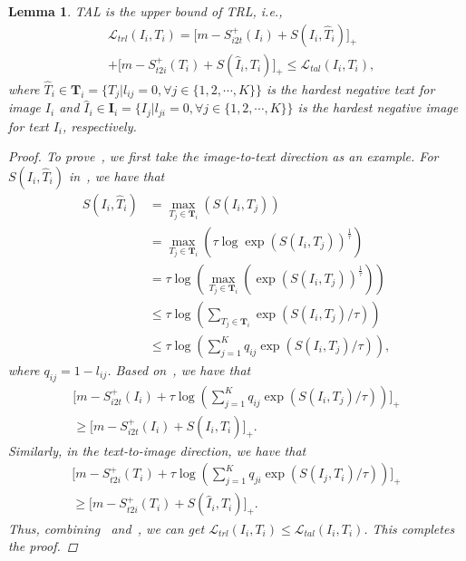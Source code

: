 \documentclass[10pt,twocolumn,letterpaper]{article}
\newtheorem{lemma}{Lemma}
\newtheorem{proof}{Proof}
\begin{document}
\begin{lemma}
    TAL is the upper bound of TRL, i.e.,
    \begin{equation}
    \begin{aligned}
        &\mathcal{L}_{trl}(I_i,T_i)= \big[ m -  S^+_{i2t}(I_i) +  S(I_i,\hat{T}_i)  \big]_+    \\
&+\big[ m -  S^+_{t2i}(T_i)  + S(\hat{I}_i,T_i) \big]_+ \leq \mathcal{L}_{tal}(I_i,T_i),
    \end{aligned}
    \label{eq2}
    \end{equation}
    where $\hat{T}_i\in\mathbf{T}_i=\{ T_j|l_{ij}=0, \forall j\in \{1,2,\cdots,K\} \}$ is the hardest negative text for image $I_i$ and $\hat{I}_i\in\mathbf{I}_i=\{ I_j|l_{ji}=0, \forall j\in \{1,2,\cdots,K\} \}$ is the hardest negative image for text $I_i$, respectively. 
    \label{lam1_}

    \begin{proof}
To prove~, we first take the image-to-text direction as an example. For $S(I_i,\hat{T}_i)$ in~, we have that
\begin{equation}
    \begin{aligned}
            S(I_i,\hat{T}_i) &= \max_{T_j\in\mathbf{T}_i}\left(S(I_i,T_j)\right)\\
            &=\max_{T_j\in\mathbf{T}_i}\left( \tau \log \exp\left(S(I_i,T_j)\right)^{\frac{1}{\tau}} \right)\\
             &= \tau \log \left(\max_{T_j\in\mathbf{T}_i} \left( \exp\left(S(I_i,T_j)\right)^{\frac{1}{\tau}} \right) \right)\\
             &\leq \tau \log \left(  \sum_{T_j\in\mathbf{T}_i} \exp(S(I_i,T_j)/\tau)\right)\\
             &\leq \tau \log (  \sum_{j=1}^K q_{ij} \exp(S(I_i,T_j)/\tau)),
    \end{aligned}
    \label{eq3}
    \end{equation}
    where $q_{ij} = 1 - l_{ij}$. Based on~, we have that
    \begin{equation}
    \begin{gathered}
        \big[ m -  S^+_{i2t}(I_i) + \tau \log ( \sum_{j = 1}^K q_{ij}\exp(S(I_i,T_j)/\tau)  ) \big]_+\\ \ge
        \big[ m -  S^+_{i2t}(I_i) +  S(I_i,\hat{T}_i)  \big]_+
        .
    \end{gathered}
    \label{eq4}
    \end{equation}
    Similarly, in the text-to-image direction, we have that
    \begin{equation}
    \begin{gathered}
        \big[ m -  S^+_{t2i}(T_i)  + \tau \log ( \sum_{j = 1}^K q_{ji}\exp(S(I_j,T_i)/\tau)  ) \big]_+\\
        \ge \big[ m -  S^+_{t2i}(T_i)  + S(\hat{I}_i,T_i) \big]_+.
    \end{gathered}
    \label{eq5}
    \end{equation}
    Thus, combining~ and~, we can get $\mathcal{L}_{trl}(I_i,T_i)\leq\mathcal{L}_{tal}(I_i,T_i)$.  This completes the proof.
    \end{proof} 
    

\end{lemma}
\end{document}
